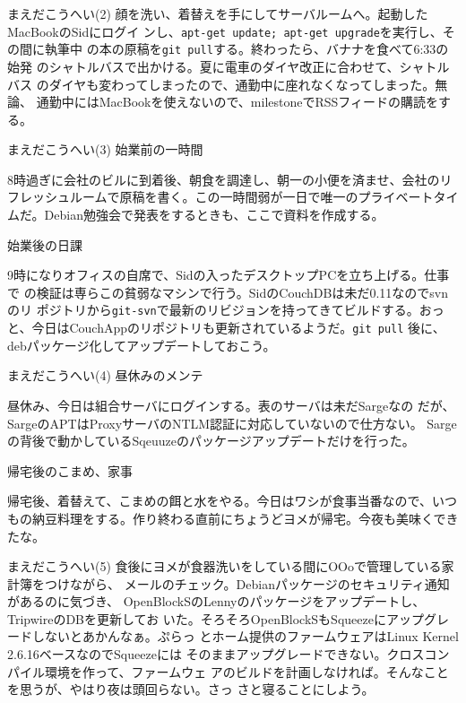 \begin{frame}{まえだこうへい(2)}
 顔を洗い、着替えを手にしてサーバルームへ。起動したMacBookのSidにログイ
 ンし、\texttt{apt-get update; apt-get upgrade}を実行し、その間に執筆中
 の本の原稿を\texttt{git pull}する。終わったら、バナナを食べて6:33の始発
 のシャトルバスで出かける。夏に電車のダイヤ改正に合わせて、シャトルバス
 のダイヤも変わってしまったので、通勤中に座れなくなってしまった。無論、
 通勤中にはMacBookを使えないので、milestoneでRSSフィードの購読をする。
\end{frame}

\begin{frame}{まえだこうへい(3)}
始業前の一時間

8時過ぎに会社のビルに到着後、朝食を調達し、朝一の小便を済ませ、会社のリ
フレッシュルームで原稿を書く。この一時間弱が一日で唯一のプライベートタイ
ムだ。Debian勉強会で発表をするときも、ここで資料を作成する。


始業後の日課

9時になりオフィスの自席で、Sidの入ったデスクトップPCを立ち上げる。仕事で
の検証は専らこの貧弱なマシンで行う。SidのCouchDBは未だ0.11なのでsvnのリ
ポジトリから\texttt{git-svn}で最新のリビジョンを持ってきてビルドする。おっ
と、今日はCouchAppのリポジトリも更新されているようだ。\texttt{git pull}
後に、debパッケージ化してアップデートしておこう。
\end{frame}

\begin{frame}{まえだこうへい(4)}
昼休みのメンテ

昼休み、今日は組合サーバにログインする。表のサーバは未だSargeなの
だが、SargeのAPTはProxyサーバのNTLM認証に対応していないので仕方ない。
Sargeの背後で動かしているSqeuuzeのパッケージアップデートだけを行った。

帰宅後のこまめ、家事

帰宅後、着替えて、こまめの餌と水をやる。今日はワシが食事当番なので、いつ
もの納豆料理をする。作り終わる直前にちょうどヨメが帰宅。今夜も美味くでき
たな。
\end{frame}

\begin{frame}{まえだこうへい(5)}
食後にヨメが食器洗いをしている間にOOoで管理している家計簿をつけながら、
メールのチェック。Debianパッケージのセキュリティ通知があるのに気づき、
OpenBlockSのLennyのパッケージをアップデートし、TripwireのDBを更新してお
いた。そろそろOpenBlockSもSqueezeにアップグレードしないとあかんなぁ。ぷらっ
とホーム提供のファームウェアはLinux Kernel 2.6.16ベースなのでSqueezeには
そのままアップグレードできない。クロスコンパイル環境を作って、ファームウェ
アのビルドを計画しなければ。そんなことを思うが、やはり夜は頭回らない。さっ
さと寝ることにしよう。
\end{frame}

